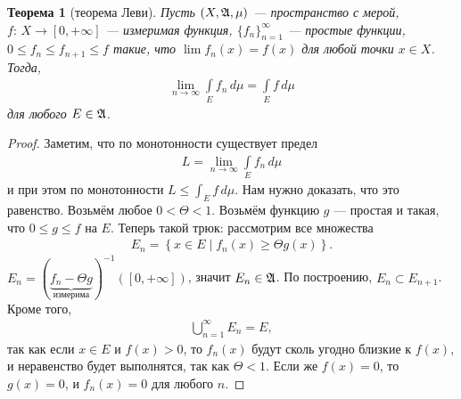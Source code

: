 \documentclass[a4paper,14pt]{extarticle}
\newcounter{theoremCnt}
\theoremstyle{definition}
\theoremstyle{plain}
\newtheorem{thm}[theoremCnt]{Теорема}
\theoremstyle{plain}
\theoremstyle{plain}
\theoremstyle{plain}
\theoremstyle{definition}
\theoremstyle{definition}
\theoremstyle{definition}
\theoremstyle{definition}
\theoremstyle{definition}
\theoremstyle{definition}
\theoremstyle{plain}
\theoremstyle{plain}
\theoremstyle{plain}
\theoremstyle{plain}
\theoremstyle{definition}
\theoremstyle{definition}
\theoremstyle{definition}
\theoremstyle{definition}
\theoremstyle{definition}
\newcommand{\A}{\ensuremath \mathfrak{A}}
\begin{document}
\begin{thm}[теорема Леви]
 \label{theorem:levi}
 Пусть $(X, \A, \mu)$ --- пространство с мерой, $f \colon\, X \to [0, +\infty] $ --- измеримая функция, $\{f_{n}\}_{n=1}^{\infty} $ --- простые функции, $0 \leqslant f_n \leqslant f_{n+1} \leqslant f$ такие, что $\lim f_n(x) = f(x)$ для любой точки  $x \in X$. Тогда, \begin{align*}
  \lim\limits_{n \to \infty} \int\limits_E f_n \, d\mu = \int\limits_E f \, d\mu
 \end{align*} для любого $E \in \A$.
\end{thm}
\begin{proof}
 Заметим, что по монотонности существует предел 
\begin{align*}
L = \lim_{n \to \infty} \int\limits_E f_n \, d\mu
\end{align*} и при этом по монотонности $L \leqslant \int_E f\,d\mu$. Нам нужно доказать, что это равенство. Возьмём любое $0 < \Theta < 1$. Возьмём функцию $g$ --- простая и такая, что $0 \leqslant g \leqslant f$ на $E$. Теперь такой трюк: рассмотрим все множества \begin{align*}
 E_n = \left\{ x \in E \mid f_n(x) \geqslant \Theta g(x) \right\}
 .\end{align*} $E_n = (\underbrace{f_n - \Theta g}_{\text{ измерима }})^{-1}([0, +\infty])$, значит $E_n \in \A$. По построению, $E_n \subset E_{n+1}$. Кроме того, \begin{align*}
 \bigcup_{n=1}^{\infty} E_n = E
,\end{align*} так как если $x \in E$ и $f(x) > 0$, то $f_n(x)$ будут сколь угодно близкие к  $f(x)$, и неравенство будет выполнятся, так как  $\Theta < 1$. Если же  $f(x) = 0$, то  $g(x) = 0$, и $f_n(x) = 0$ для любого  $n$.


\end{proof}
\end{document}
